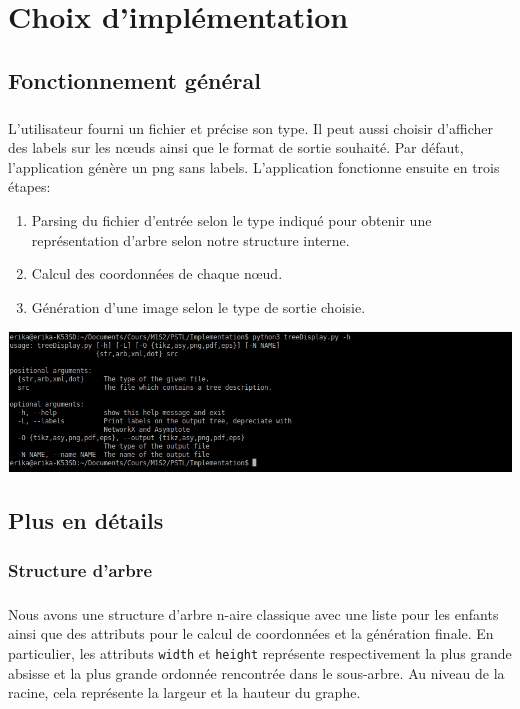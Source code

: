 \chapter{Choix d'implémentation}

\section{Fonctionnement général}

\paragraph{}L'utilisateur fourni un fichier et précise son type. Il peut aussi choisir d'afficher des labels sur les n\oe uds ainsi que le format de sortie souhaité. Par défaut, l'application génère un png sans labels. L'application fonctionne ensuite en trois étapes:
\begin{enumerate}
	\item Parsing du fichier d'entrée selon le type indiqué pour obtenir une représentation d'arbre selon notre structure interne.
	\item Calcul des coordonnées de chaque n\oe ud.
	\item Génération d'une image selon le type de sortie choisie.
\end{enumerate}

\begin{center}
\includegraphics[width=\columnwidth]{usage}
\end{center}

\section{Plus en détails}

	\subsection{Structure d'arbre}
	
\paragraph{}Nous avons une structure d'arbre n-aire classique avec une liste pour les enfants ainsi que des attributs pour le calcul de coordonnées et la génération finale. En particulier, les attributs \verb|width| et \verb|height| représente respectivement la plus grande absisse et la plus grande ordonnée rencontrée dans le sous-arbre. Au niveau de la racine, cela représente la largeur et la hauteur du graphe.
	
